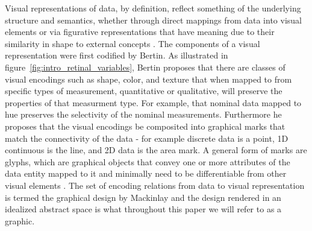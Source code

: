 \documentclass[../main.tex]{subfiles}
\begin{document}
Visual representations of data, by definition, reflect something of the underlying structure and semantics\cite{friendlyBriefHistoryData2008}, whether through direct mappings from data into visual elements or via figurative representations that have meaning due to their similarity in shape to external concepts \cite{byrneAcquiredCodesMeaning2016}. The components of a visual representation were first codified by Bertin\cite{bertinSemiologyGraphicsDiagrams2011a}.  As illustrated in figure~\ref{fig:intro_retinal_variables}, Bertin proposes that there are classes of visual encodings such as shape, color, and texture that when mapped to from specific types of measurement, quantitative or qualitative, will preserve the properties of that measurment type. For example, that nominal data mapped to hue preserves the selectivity of the nominal measurements. Furthermore he proposes that the visual encodings be composited into graphical marks that match the connectivity of the data - for example discrete data is a point, 1D continuous is the line, and 2D data is the area mark. A general form of marks are glyphs, which are graphical objects that convey one or more attributes of the data entity mapped to it\cite{ware2019information, munznerVisualizationAnalysisDesign2014} and minimally need to be differentiable from other visual elements \cite{ziemkiewiczEmbeddingInformationVisualization2009}. The set of encoding relations from data to visual representation is termed the graphical design by Mackinlay \cite{mackinlayAutomatingDesignGraphical1986, mackinlayAUTOMATICDESIGNGRAPHICAL1987} and the design rendered in an idealized abstract space is what throughout this paper we will refer to as a graphic. 
\end{document}
